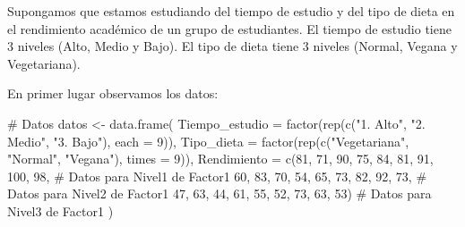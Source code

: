 \documentclass[
  letterpaper,
  DIV=11,
  numbers=noendperiod]{scrreprt}
\newenvironment{Shaded}{\begin{snugshade}}{\end{snugshade}}
\newcommand{\AttributeTok}[1]{\textcolor[rgb]{0.40,0.45,0.13}{#1}}
\newcommand{\CommentTok}[1]{\textcolor[rgb]{0.37,0.37,0.37}{#1}}
\newcommand{\DecValTok}[1]{\textcolor[rgb]{0.68,0.00,0.00}{#1}}
\newcommand{\FunctionTok}[1]{\textcolor[rgb]{0.28,0.35,0.67}{#1}}
\newcommand{\NormalTok}[1]{\textcolor[rgb]{0.00,0.23,0.31}{#1}}
\newcommand{\OtherTok}[1]{\textcolor[rgb]{0.00,0.23,0.31}{#1}}
\newcommand{\StringTok}[1]{\textcolor[rgb]{0.13,0.47,0.30}{#1}}
\begin{document}
\begin{tcolorbox}[enhanced jigsaw, arc=.35mm, breakable, coltitle=black, left=2mm, opacityback=0, bottomtitle=1mm, colbacktitle=quarto-callout-tip-color!10!white, title=\textcolor{quarto-callout-tip-color}{\faLightbulb}\hspace{0.5em}{Ejemplo. ANOVA de dos factores sin interacción}, titlerule=0mm, colback=white, colframe=quarto-callout-tip-color-frame, bottomrule=.15mm, rightrule=.15mm, opacitybacktitle=0.6, toptitle=1mm, toprule=.15mm, leftrule=.75mm]

Supongamos que estamos estudiando del tiempo de estudio y del tipo de
dieta en el rendimiento académico de un grupo de estudiantes. El tiempo
de estudio tiene \(3\) niveles (Alto, Medio y Bajo). El tipo de dieta
tiene \(3\) niveles (Normal, Vegana y Vegetariana).

En primer lugar observamos los datos:

\begin{Shaded}
\begin{Highlighting}[]
\CommentTok{\# Datos}
\NormalTok{datos }\OtherTok{\textless{}{-}} \FunctionTok{data.frame}\NormalTok{(}
  \AttributeTok{Tiempo\_estudio =} \FunctionTok{factor}\NormalTok{(}\FunctionTok{rep}\NormalTok{(}\FunctionTok{c}\NormalTok{(}\StringTok{"1. Alto"}\NormalTok{, }\StringTok{"2. Medio"}\NormalTok{, }\StringTok{"3. Bajo"}\NormalTok{), }\AttributeTok{each =} \DecValTok{9}\NormalTok{)),}
  \AttributeTok{Tipo\_dieta =} \FunctionTok{factor}\NormalTok{(}\FunctionTok{rep}\NormalTok{(}\FunctionTok{c}\NormalTok{(}\StringTok{"Vegetariana"}\NormalTok{, }\StringTok{"Normal"}\NormalTok{, }\StringTok{"Vegana"}\NormalTok{), }\AttributeTok{times =} \DecValTok{9}\NormalTok{)),}
  \AttributeTok{Rendimiento =} \FunctionTok{c}\NormalTok{(}\DecValTok{81}\NormalTok{, }\DecValTok{71}\NormalTok{, }\DecValTok{90}\NormalTok{, }\DecValTok{75}\NormalTok{, }\DecValTok{84}\NormalTok{, }\DecValTok{81}\NormalTok{, }\DecValTok{91}\NormalTok{, }\DecValTok{100}\NormalTok{, }\DecValTok{98}\NormalTok{, }\CommentTok{\# Datos para Nivel1 de Factor1}
                \DecValTok{60}\NormalTok{, }\DecValTok{83}\NormalTok{, }\DecValTok{70}\NormalTok{, }\DecValTok{54}\NormalTok{, }\DecValTok{65}\NormalTok{, }\DecValTok{73}\NormalTok{, }\DecValTok{82}\NormalTok{, }\DecValTok{92}\NormalTok{, }\DecValTok{73}\NormalTok{, }\CommentTok{\# Datos para Nivel2 de Factor1}
                \DecValTok{47}\NormalTok{, }\DecValTok{63}\NormalTok{, }\DecValTok{44}\NormalTok{, }\DecValTok{61}\NormalTok{, }\DecValTok{55}\NormalTok{, }\DecValTok{52}\NormalTok{, }\DecValTok{73}\NormalTok{, }\DecValTok{63}\NormalTok{, }\DecValTok{53}\NormalTok{) }\CommentTok{\# Datos para Nivel3 de Factor1}
\NormalTok{)}


\end{Highlighting}
\end{Shaded}
\end{tcolorbox}
\end{document}
